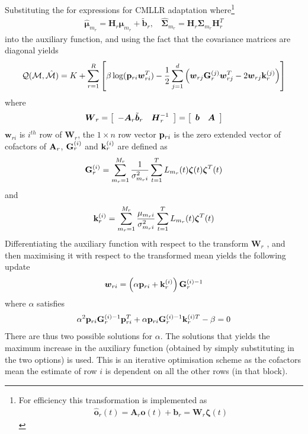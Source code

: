 Substituting the for expressions for CMLLR adaptation where\footnote{For
efficiency this transformation is implemented as
\begin{eqnarray}
\hat{\bm o}_r(t) = \bm{A}_r\bm{o}(t) + \bm{b}_r = \bm{W}_r\bm{\zeta}(t)
\end{eqnarray}
}
\begin{eqnarray}
\hat{\bm{\mu}}_{m_r} = \bm{H}_r\bm{\mu}_{m_r} + \tilde{\bm{b}}_r, \:\:\:\: 
\hat{\bm{\Sigma}}_{m_r} = {\bm H}_r{\bm{\Sigma}}_{m_r}{\bm H}_r^T
\end{eqnarray}
into the auxiliary function, and using the fact that the covariance
matrices are diagonal yields
\begin{eqnarray}
{\cal Q}({\cal M},{\hat{\cal M}}) = K + 
\sum_{r=1}^R\left[
\beta\log({\bf p}_{ri}{\mbox{\boldmath $w$}}_{ri}^T)-
\frac{1}{2}
\sum_{j=1}^d{
\left({\mbox{\boldmath $w$}}_{rj}{\bf G}^{(j)}_r{\mbox{\boldmath $w$}}^T_{rj} - 2{\mbox{\boldmath $w$}}_{rj}{\bf k}^{(j)}_r
\right)}\right] \nonumber
\end{eqnarray}
where 
\begin{eqnarray}
{\mbox{\boldmath $W$}}_r = \left[\begin{array}{c c}
-{\mbox{\boldmath $A$}}_r\tilde{{\mbox{\boldmath $b$}}}_r & {\mbox{\boldmath $H$}}_r^{-1} \end{array}
\right] =  \left[\begin{array}{c c}
{\mbox{\boldmath $b$}} & {\mbox{\boldmath $A$}} \end{array}
\right]
\end{eqnarray}
$\bm{w}_{ri}$ is $i^{th}$ row of $\bm{W}_r$, the $1\times n$ row vector ${\bf p}_{ri}$ is the zero  
extended vector of cofactors of ${\bf A}_r$, ${\bf G}^{(i)}_r$ and ${\bf k}^{(i)}_r$ are defined as
\begin{eqnarray}
{\bf G}^{(i)}_r=\sum_{m_r=1}^{M_r}
\frac{1}{\sigma_{m_ri}^{2}}
\sum_{t=1}^TL_{m_r}(t){{\mbox{\boldmath $\zeta$}}}(t){{\mbox{\boldmath $\zeta$}}}^{T}(t)
\label{eq:gi_mllr3}
\end{eqnarray}
and 
\begin{eqnarray}
{\bf k}^{(i)}_r=\sum_{m_r=1}^{M_r}
\frac{\mu_{m_ri}}{\sigma_{m_ri}^{2}}
\sum_{t=1}^TL_{m_r}(t){{\mbox{\boldmath $\zeta$}}}^{T}(t)
\label{eq:gi_mllr4}
\end{eqnarray}
Differentiating the auxiliary function with respect to the transform
$\bm{W}_r$ , and then maximising it with respect to the transformed mean
yields the following update
\begin{eqnarray}
{\mbox{\boldmath $w$}}_{ri} = \left(\alpha{{\bf p}_{ri}} + {\bf k}^{(i)}_r\right){\bf G}^{(i)-1}_r
\end{eqnarray}
where $\alpha$ satisfies
\begin{eqnarray}
\alpha^2{\bf p}_{ri}{\bf G}^{(i)-1}_r{\bf p}_{ri}^T +
\alpha{\bf p}_{ri}{\bf G}^{(i)-1}_r{\bf k}^{(i)T}_r - \beta=0\label{eq:alpha_quad}
\end{eqnarray}
There are thus two possible solutions for $\alpha$. The solutions that
yields the maximum increase in the auxiliary function (obtained by
simply substituting in the two options) is used. This is an iterative
optimisation scheme as the cofactors mean the estimate of row $i$ is
dependent on all the other rows (in that block).

